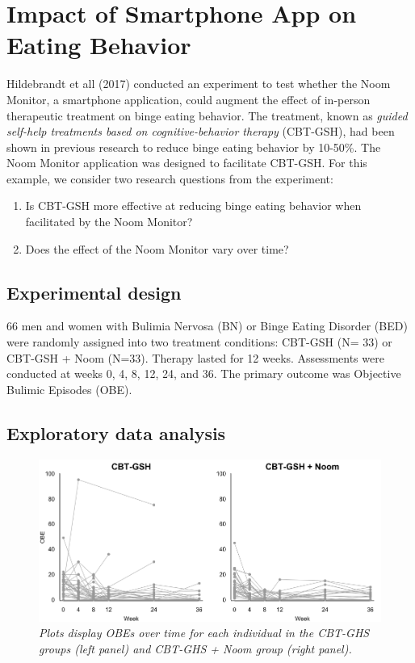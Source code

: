 \documentclass[12pt, oneside]{article}
\begin{document}
\section{Impact of Smartphone App on Eating Behavior}

Hildebrandt et all (2017) conducted an experiment to test whether the Noom Monitor, a smartphone application, could augment the effect of in-person therapeutic treatment on binge eating behavior.  The treatment, known as \emph{guided self-help treatments based on cognitive-behavior therapy} (CBT-GSH), had been shown in previous research to reduce binge eating behavior by 10-50\%.  The Noom Monitor application was designed to facilitate CBT-GSH.  For this example, we consider two research questions from the experiment:
\begin{enumerate}
\item{Is CBT-GSH more effective at reducing binge eating behavior when facilitated by the Noom Monitor?}
\item{Does the effect of the Noom Monitor vary over time?}
\end{enumerate}

\subsection{Experimental design}

66 men and women with Bulimia Nervosa (BN) or Binge Eating Disorder (BED) were randomly assigned into two treatment conditions: CBT-GSH (N= 33) or CBT-GSH + Noom (N=33).  Therapy lasted for 12 weeks.  Assessments were conducted at weeks 0, 4, 8, 12, 24, and 36.  The primary outcome was Objective Bulimic Episodes (OBE).  

\subsection{Exploratory data analysis}

\begin{figure}[h]
\centering
\includegraphics[width=\textwidth, height=\textheight, keepaspectratio]{Noom_paths.png}
\caption{\emph{Plots display OBEs over time for each individual in the CBT-GHS groups (left panel) and CBT-GHS + Noom group (right panel).}}
\end{figure}
\end{document}
